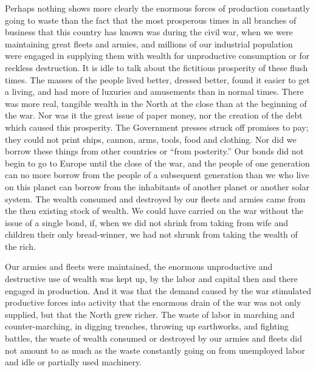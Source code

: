 \documentclass{book}
\begin{document}
Perhaps nothing shows more clearly the enormous forces of production constantly going to waste than the fact that the most prosperous times in all branches of business that this country has known was during the civil war, when we were maintaining great fleets and armies, and millions of our industrial population were engaged in supplying them with wealth for unproductive consumption or for reckless destruction. It is idle to talk about the fictitious prosperity of these flush times. The masses of the people lived better, dressed better, found it easier to get a living, and had more of luxuries and amusements than in normal times. There was more real, tangible wealth in the North at the close than at the beginning of the war. Nor was it the great issue of paper money, nor the creation of the debt which caused this prosperity. The Government presses struck off promises to pay; they could not print ships, cannon, arms, tools, food and clothing. Nor did we borrow these things from other countries or “from posterity.” Our bonds did not begin to go to Europe until the close of the war, and the people of one generation can no more borrow from the people of a subsequent generation than we who live on this planet can borrow from the inhabitants of another planet or another solar system. The wealth consumed and destroyed by our fleets and armies came from the then existing stock of wealth. We could have carried on the war without the issue of a single bond, if, when we did not shrink from taking from wife and children their only bread-winner, we had not shrunk from taking the wealth of the rich.

Our armies and fleets were maintained, the enormous unproductive and destructive use of wealth was kept up, by the labor and capital then and there engaged in production. And it was that the demand caused by the war stimulated productive forces into activity that the enormous drain of the war was not only supplied, but that the North grew richer. The waste of labor in marching and counter-marching, in digging trenches, throwing up earthworks, and fighting battles, the waste of wealth consumed or destroyed by our armies and fleets did not amount to as much as the waste constantly going on from unemployed labor and idle or partially used machinery.
\end{document}
